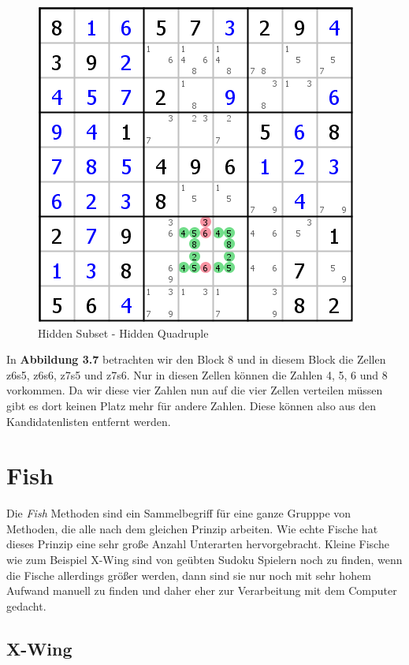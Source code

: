 \documentclass[accentcolor=tud6b,11pt,paper=a4]{tudreport}
\begin{document}
\begin{figure}[h]
\begin{center}
\includegraphics{./img/hidden_subset.png}
\caption{Hidden Subset - Hidden Quadruple}
\end{center}
\end{figure}

In \textbf{Abbildung 3.7} betrachten wir den Block 8 und in diesem Block die Zellen z6s5, z6s6, z7s5 und z7s6. Nur in diesen Zellen können die Zahlen 4, 5, 6 und 8 vorkommen. Da wir diese vier Zahlen nun auf die vier Zellen verteilen müssen gibt es dort keinen Platz mehr für andere Zahlen. Diese können also aus den Kandidatenlisten entfernt werden.


\newpage
\section{Fish}
Die \textit{Fish} Methoden sind ein Sammelbegriff für eine ganze Grupppe von Methoden, die alle nach dem gleichen Prinzip arbeiten. Wie echte Fische hat dieses Prinzip eine sehr große Anzahl Unterarten hervorgebracht. Kleine Fische wie zum Beispiel X-Wing sind von geübten Sudoku Spielern noch zu finden, wenn die Fische allerdings größer werden, dann sind sie nur noch mit sehr hohem Aufwand manuell zu finden und daher eher zur Verarbeitung mit dem Computer gedacht.

\newpage
\subsection{X-Wing}
\end{document}
